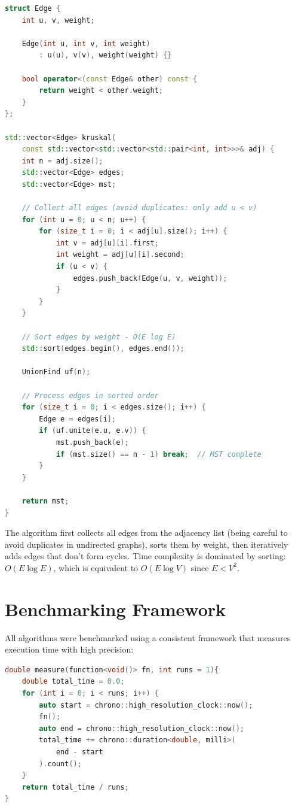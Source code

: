 \documentclass[12pt, a4paper]{report}
\begin{document}
\begin{lstlisting}[language=C++, caption={Kruskal's algorithm implementation}]
struct Edge {
    int u, v, weight;
    
    Edge(int u, int v, int weight) 
        : u(u), v(v), weight(weight) {}
    
    bool operator<(const Edge& other) const {
        return weight < other.weight;
    }
};

std::vector<Edge> kruskal(
    const std::vector<std::vector<std::pair<int, int>>>& adj) {
    int n = adj.size();
    std::vector<Edge> edges;
    std::vector<Edge> mst;
    
    // Collect all edges (avoid duplicates: only add u < v)
    for (int u = 0; u < n; u++) {
        for (size_t i = 0; i < adj[u].size(); i++) {
            int v = adj[u][i].first;
            int weight = adj[u][i].second;
            if (u < v) {
                edges.push_back(Edge(u, v, weight));
            }
        }
    }
    
    // Sort edges by weight - O(E log E)
    std::sort(edges.begin(), edges.end());
    
    UnionFind uf(n);
    
    // Process edges in sorted order
    for (size_t i = 0; i < edges.size(); i++) {
        Edge e = edges[i];
        if (uf.unite(e.u, e.v)) {
            mst.push_back(e);
            if (mst.size() == n - 1) break;  // MST complete
        }
    }
    
    return mst;
}
\end{lstlisting}

The algorithm first collects all edges from the adjacency list (being careful to avoid duplicates in undirected graphs), sorts them by weight, then iteratively adds edges that don't form cycles. Time complexity is dominated by sorting: $O(E \log E)$, which is equivalent to $O(E \log V)$ since $E < V^2$.

\section{Benchmarking Framework}

All algorithms were benchmarked using a consistent framework that measures execution time with high precision:

\begin{lstlisting}[language=C++, caption={Benchmark measurement function}]
double measure(function<void()> fn, int runs = 1){
    double total_time = 0.0;
    for (int i = 0; i < runs; i++) {
        auto start = chrono::high_resolution_clock::now();
        fn();
        auto end = chrono::high_resolution_clock::now();
        total_time += chrono::duration<double, milli>(
            end - start
        ).count();
    }
    return total_time / runs;
}
\end{lstlisting}
\end{document}
